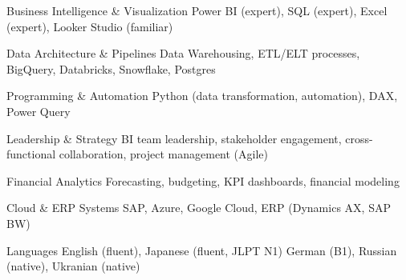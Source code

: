


\begin{cvskills}

\cvskill
{Business Intelligence \& Visualization} %
{Power BI (expert), SQL (expert), Excel (expert), Looker Studio (familiar)} %

\cvskill
{Data Architecture \& Pipelines} %
{Data Warehousing, ETL/ELT processes, BigQuery, Databricks,
\newline
Snowflake, Postgres } %

\cvskill
{Programming \& Automation} %
{Python (data transformation, automation), DAX, Power Query} %

\cvskill
{Leadership \& Strategy} %
{BI team leadership, stakeholder engagement, cross-functional
\newline
collaboration, project management (Agile)} %

\cvskill
{Financial Analytics} %
{Forecasting, budgeting, KPI dashboards, financial modeling} %

\cvskill
{Cloud \& ERP Systems} %
{SAP, Azure, Google Cloud, ERP (Dynamics AX, SAP BW)} %



\cvskill
{Languages} %
{ English (fluent), Japanese (fluent, JLPT N1) German (B1), \newline
Russian (native), Ukranian (native)} %


\end{cvskills}
